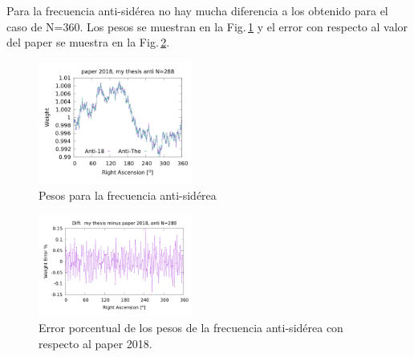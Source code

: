 Para la frecuencia anti-sidérea no hay mucha diferencia a los obtenido para el caso de N=360. Los pesos se muestran en la Fig.\,\ref{fig:anti_288} y el error con respecto al valor del paper se muestra en la Fig.\,\ref{fig:error_288_anti}.

\begin{figure}[H]
	\centering
	\includegraphics[width=0.45\textwidth]{anti_my_and_paper_2018_in_288.png}
	\caption{Pesos para la frecuencia anti-sidérea}
	\label{fig:anti_288}
\end{figure}


\begin{figure}[H]
	\centering
	\includegraphics[width=0.45\textwidth]{anti_my_and_paper_in_288_error.png}
	\caption{Error porcentual de los pesos de la frecuencia anti-sidérea con respecto al paper 2018.}
	\label{fig:error_288_anti}
\end{figure}
